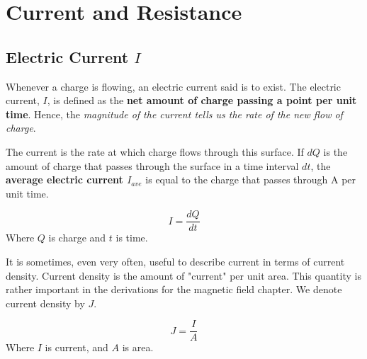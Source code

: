 \section{Current and Resistance}
\subsection{Electric Current $I$}
Whenever a charge is flowing, an electric current  said is to exist. The electric current, $I$, is defined as the \textbf{net amount of charge passing a point per unit time}. Hence, the \textit{magnitude of the current tells us the rate of the new flow of charge}.

The current is the rate at which charge flows through this surface. If $d Q$ is the amount of charge that passes through the surface in a time interval $d t$, the \textbf{average electric current $I_{ave}$} is equal to the charge that passes through A per unit time.

\begin{defi}
$$I = \frac{d Q}{d t}$$
Where $Q$ is charge and $t$ is time.
\end{defi}

It is sometimes, even very often, useful to describe current in terms of current density. Current density is the amount of "current" per unit area. This quantity is rather important in the derivations for the magnetic field chapter. We denote current density by $J$.

\begin{defi}
$$J = \frac{I}{A}$$
Where $I$ is current, and $A$ is area.
\end{defi}